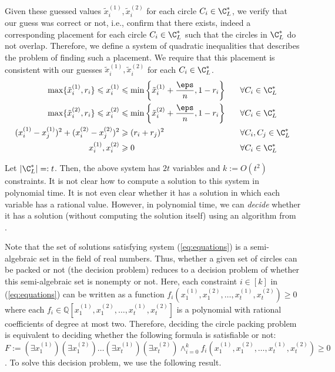 \documentclass[10pt,a4paper]{article}
\theoremstyle{plain}
\theoremstyle{plain}
\theoremstyle{plain}
\theoremstyle{definition}
\newcommand{\agtwo}[1]{#1}
\begin{document}
{Given these guessed values $\tilde{x}_{i}^{(1)},\tilde{x}_{i}^{(2)}$
for each circle $C_{i}\in\C_{L}^{*}$, we verify that our guess was
correct or not, i.e., confirm that there exists, indeed a corresponding placement
for each circle $C_{i}\in\C_{L}^{*}$ such that the circles in $\C_{L}^{*}$
do not overlap. Therefore, we define a system of quadratic inequalities
 that \agtwo{describes} the problem of finding such a placement.
We require that this placement is consistent with
our guesses $\tilde{x}_{i}^{(1)},\tilde{x}_{i}^{(2)}$ for each $C_{i}\in\C_{L}^{*}$.
\begin{alignat}{2}
\max\{\tilde{x}_{i}^{(1)},r_{i}\}\leqslant x_{i}^{(1)} & \leqslant\min\left\{ \tilde{x}_{i}^{(1)}+\frac{\eps}{n},1-r_{i}\right\}  & \,\,\,\,\, & \forall C_{i}\in\C_{L}^{*}\nonumber \\
\max\{\tilde{x}_{i}^{(2)},r_{i}\}\leqslant x_{i}^{(2)} & \leqslant\min\left\{ \tilde{x}_{i}^{(2)}+\frac{\eps}{n},1-r_{i}\right\}  &  & \forall C_{i}\in\C_{L}^{*}\label{eq:equations}\\
(x_{i}^{(1)}-x_{j}^{(1)})^{2}+(x_{i}^{(2)}-x_{j}^{(2)})^{2} & \geqslant(r_{i}+r_{j})^{2} &  & \forall C_{i},C_{j}\in\C_{L}^{*}\nonumber \\
x_{i}^{(1)},x_{i}^{(2)} & \geqslant0 &  & \forall C_{i}\in\C_{L}^{*}\nonumber
\end{alignat}

Let $|\C_{L}^{*}|=: t$. Then, the above system has $2t$ variables and $k:=O(t^2)$ constraints. 
It is not clear how to compute a solution to this system in polynomial
time. It is not even clear whether it has a solution in which each variable
has a rational value. However, in polynomial time, we can \emph{decide}
whether it has a solution (without computing the solution itself) using an algorithm from \cite{GrigorevVV88}.

Note that the set of solutions satisfying system (\ref{eq:equations}) is a semi-algebraic set in the field of real numbers. 
Thus, whether a given set of circles can be packed or not (the decision problem) reduces to a decision problem of whether
this semi-algebraic set is nonempty or not. 
Here, each constraint $i \in [k]$ in (\ref{eq:equations}) can be written as a function $f_i (x_{1}^{(1)},x_{1}^{(2)}, \dots, x_{t}^{(1)},x_{t}^{(2)})\geqslant 0$ where each $f_i \in \mathbb{Q}[x_{1}^{(1)},x_{1}^{(2)}, \dots, x_{t}^{(1)},x_{t}^{(2)}]$ is a polynomial with rational coefficients of degree at most two.
Therefore, deciding the circle packing problem is equivalent to deciding whether the following formula is satisfiable or not: $F:= (\exists x_{1}^{(1)})(\exists x_{1}^{(2)}) \dots (\exists x_{t}^{(1)}) (\exists x_{t}^{(2)}) \land_{i=0}^{k} f_i(x_{1}^{(1)},x_{1}^{(2)}, \dots, x_{t}^{(1)},x_{t}^{(2)}) \geqslant 0$. 
To solve this decision problem, we use the following result.

}
\end{document}

